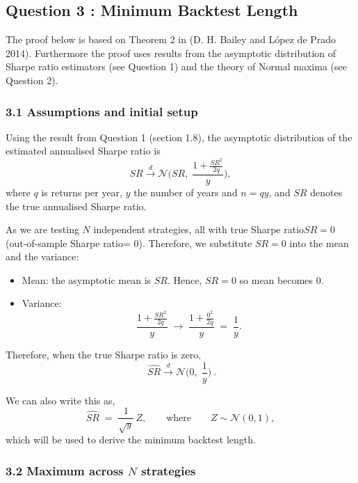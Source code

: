 \documentclass[
  12pt,
]{article}
\providecommand{\tightlist}{%
  \setlength{\itemsep}{0pt}\setlength{\parskip}{0pt}}
\begin{document}
\subsection{Question 3 : Minimum Backtest
Length}\label{question-3-minimum-backtest-length}

The proof below is based on Theorem 2 in (D. H. Bailey and López de
Prado 2014). Furthermore the proof uses results from the asymptotic
distribution of Sharpe ratio estimators (see Question 1) and the theory
of Normal maxima (see Question 2).

\subsubsection{3.1 Assumptions and initial
setup}\label{assumptions-and-initial-setup}

Using the result from Question 1 (section 1.8), the asymptotic
distribution of the estimated annualised Sharpe ratio is \[
\widehat{SR}\xrightarrow{d} \mathcal{N}\!\Big(SR,\; \frac{1+\tfrac{SR^2}{2q}}{y}\Big),
\] where \(q\) is returns per year, \(y\) the number of years and
\(n=qy\), and \(SR\) denotes the true annualised Sharpe ratio.

As we are testing \(N\) independent strategies, all with true Sharpe
ratio\(SR = 0\) (out-of-sample Sharpe ratio= 0). Therefore, we
substitute \(SR=0\) into the mean and the variance:

\begin{itemize}
\tightlist
\item
  Mean: the asymptotic mean is \(SR\). Hence, \(SR=0\) so mean becomes
  \(0\).
\item
  Variance: \[
  \frac{1+\tfrac{SR^2}{2q}}{y}
  \;\longrightarrow\;
  \frac{1+\tfrac{0^2}{2q}}{y}
  \;=\; \frac{1}{y}.
  \]
\end{itemize}

Therefore, when the true Sharpe ratio is zero, \[
\;\widehat{SR}\xrightarrow{d} \mathcal{N}\!\Big(0,\; \frac{1}{y}\Big)\; .
\]

We can also write this as,\[
\widehat{SR} \;=\; \frac{1}{\sqrt{y}}\,Z,\qquad\text{where} \qquad  Z\sim\mathcal{N}(0,1),
\] which will be used to derive the minimum backtest length.

\subsubsection{\texorpdfstring{3.2 Maximum across \(N\)
strategies}{3.2 Maximum across N strategies}}\label{maximum-across-n-strategies}
\end{document}
